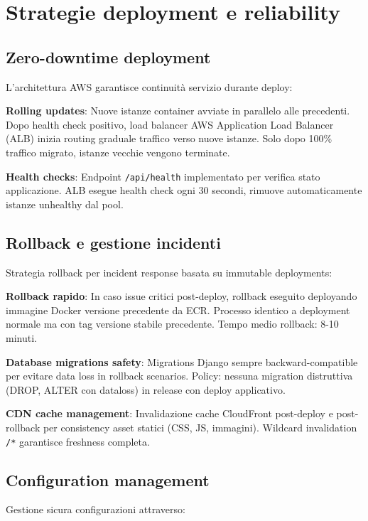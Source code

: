 \section{Strategie deployment e reliability}

\subsection{Zero-downtime deployment}

L'architettura AWS garantisce continuità servizio durante deploy:

\textbf{Rolling updates}: Nuove istanze container avviate in parallelo alle precedenti. Dopo health check positivo, load balancer AWS Application Load Balancer (ALB) inizia routing graduale traffico verso nuove istanze. Solo dopo 100\% traffico migrato, istanze vecchie vengono terminate.

\textbf{Health checks}: Endpoint \texttt{/api/health} implementato per verifica stato applicazione. ALB esegue health check ogni 30 secondi, rimuove automaticamente istanze unhealthy dal pool.

\subsection{Rollback e gestione incidenti}

Strategia rollback per incident response basata su immutable deployments:

\textbf{Rollback rapido}: In caso issue critici post-deploy, rollback eseguito deployando immagine Docker versione precedente da ECR. Processo identico a deployment normale ma con tag versione stabile precedente. Tempo medio rollback: 8-10 minuti.

\textbf{Database migrations safety}: Migrations Django sempre backward-compatible per evitare data loss in rollback scenarios. Policy: nessuna migration distruttiva (DROP, ALTER con dataloss) in release con deploy applicativo.

\textbf{CDN cache management}: Invalidazione cache CloudFront post-deploy e post-rollback per consistency asset statici (CSS, JS, immagini). Wildcard invalidation \texttt{/*} garantisce freshness completa.

\subsection{Configuration management}

Gestione sicura configurazioni attraverso:

